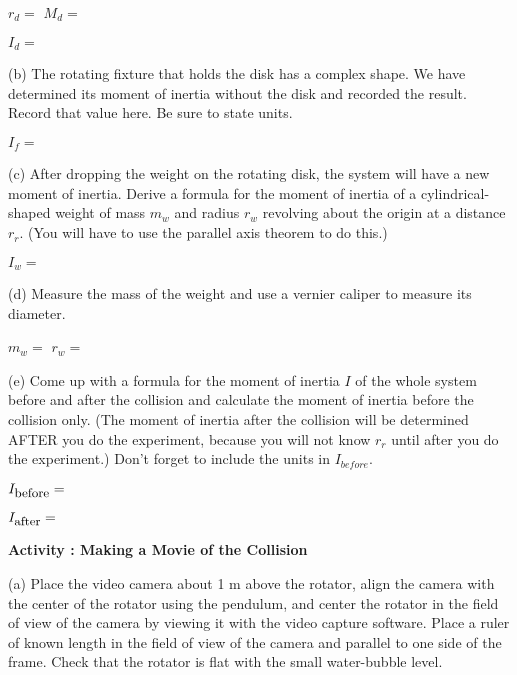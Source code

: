 \( r_{d} =\)  \hfill{}\( M_{d}= \) \hfill{}
\vspace{5mm}

\( I_{d}= \)
\vspace{5mm}

(b) The rotating fixture that holds the disk has a complex shape. We have determined its moment of inertia without the disk and recorded the result. Record that value here. Be sure to state units.
\vspace{5mm}

\( I_{f} =\)
\vspace{5mm}

(c) After dropping the weight on the rotating disk, the system will have a new
moment of inertia. Derive a formula for the moment of inertia of a cylindrical-shaped weight of mass \( m_{w} \) and radius \( r_{w} \) revolving about the origin at a distance \( r_{r} \). (You will have to use the parallel axis theorem to do this.)
\vspace{5mm}

\( I_{w} =\)  
\vspace{5mm}

(d) Measure the mass of the weight and use a vernier caliper to measure its diameter.
\vspace{5mm}

\( m_{w} =\)  \hfill{}\(r_{w} =\) \hfill{}
\vspace{5mm}

(e) Come up with a formula for the moment of inertia $I$ of the whole system
before and after the collision and calculate the moment of inertia before the
collision only. (The moment of inertia after the collision will be determined AFTER you do the experiment, because you will not know \( r_{r} \) until after you do the experiment.) Don't forget to include the units in \( I_{before} \).
\vspace{5mm}

\( I_{\mbox{\small before}}= \) 
\vspace{5mm}

\( I_{\mbox{\small after}} =\)  
\vspace{5mm}

\textbf{Activity  : Making a Movie of the Collision} 

(a) Place the video camera about 1 m above the rotator, align the camera with
the center of the rotator using the pendulum, and center the rotator in the
field of view of the camera by viewing it with the video capture software.
Place a ruler of known length in the field of view of the camera and parallel
to one side of the frame. Check that the rotator is flat with the small water-bubble level.

